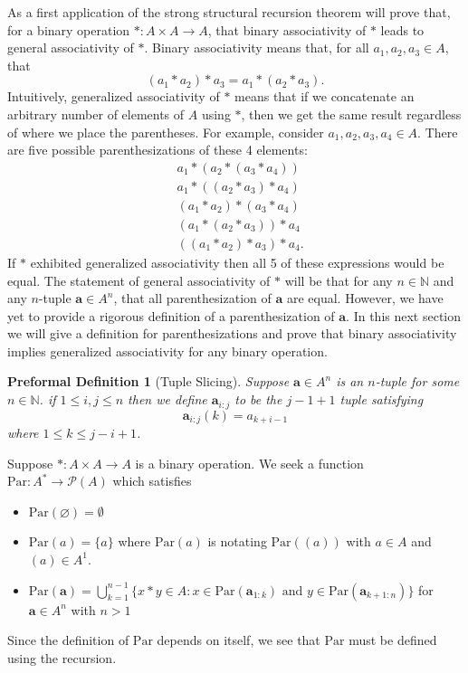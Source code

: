 \documentclass[oneside, 12pt]{book}
\theoremstyle{break}
\newtheorem{preformal definition}[definition]{Preformal Definition}
\newtheorem{preformal theorem}[theorem]{Preformal Theorem}
\newcommand{\bv}[1]{\boldsymbol{#1}}
\newcommand{\mc}[1]{\mathcal{#1}}
\newcommand{\N}[0]{\mathbb{N}}
\begin{document}
			As a first application of the strong structural recursion theorem will prove that, for a binary operation $\ast: A \times A \to A$, that binary associativity of $\ast$ leads to general associativity of $\ast$.
			Binary associativity means that, for all $a_1, a_2, a_3 \in A$, that 
			\begin{equation*}
				(a_1 \ast a_2) \ast a_3 = a_1 \ast (a_2 \ast a_3).
			\end{equation*}
			Intuitively, generalized associativity of $\ast$ means that if we concatenate an arbitrary number of elements of $A$ using $\ast$, then we get the same result regardless of where we place the parentheses.
			For example, consider $a_1, a_2, a_3, a_4 \in A$.
			There are five possible parenthesizations of these 4 elements:
			\begin{align*}
				&a_1 \ast (a_2 \ast (a_3 \ast a_4))\\
				&a_1 \ast ((a_2 \ast a_3) \ast a_4)\\
				&(a_1 \ast a_2) \ast (a_3 \ast a_4)\\
				&(a_1 \ast (a_2 \ast a_3)) \ast a_4\\
				&((a_1 \ast a_2) \ast a_3) \ast a_4.
			\end{align*}
			If $\ast$ exhibited generalized associativity then all 5 of these expressions would be equal.
			The statement of general associativity of $\ast$ will be that for any $n \in \N$ and any $n$-tuple $\bv{a} \in A^n$, that all parenthesization of $\bv{a}$ are equal.
			However, we have yet to provide a rigorous definition of a parenthesization of $\bv{a}$.
			In this next section we will give a definition for parenthesizations and prove that binary associativity implies generalized associativity for any binary operation.
			
			\begin{preformal definition}[Tuple Slicing]
				Suppose $\bv{a} \in A^n$ is an $n$-tuple for some $n\in \N$.
				if $1 \le i, j \le n$ then we define $\bv{a}_{i:j}$ to be the $j-1+1$ tuple satisfying
				\begin{equation*}
					\bv{a}_{i:j}(k) = a_{k+i-1}
				\end{equation*}
				where $1 \le k \le j-i+1$.
			\end{preformal definition}
			
			Suppose $\ast: A\times A \to A$ is a binary operation.
			We seek a function $\text{Par}: A^* \to \mc{P}(A)$ which satisfies
			\begin{itemize}
				\item{$\text{Par}(\varnothing) = \emptyset$}
				\item{$\text{Par}(a) = \{a\}$ where $\text{Par}(a)$ is notating $\text{Par}((a))$ with $a\in A$ and $(a) \in A^1$.}
				\item{$\text{Par}(\bv{a}) = \bigcup_{k=1}^{n-1} \{x \ast y \in A: x\in \text{Par}(\bv{a}_{1:k}) \text{ and } y \in \text{Par}(\bv{a}_{k+1:n})\}$ for $\bv{a} \in A^n$ with $n>1$}
			\end{itemize}		
			Since the definition of $\text{Par}$ depends on itself, we see that $\text{Par}$ must be defined using the recursion.
			
\end{document}
